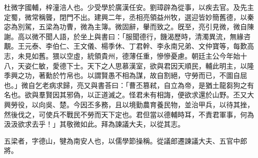 \begin{pinyinscope}
 
 
 杜微字國輔，梓潼涪人也。少受學於廣漢任安。劉璋辟為從事，以疾去官。及先主定蜀，微常稱聾，閉門不出。建興二年，丞相亮領益州牧，選迎皆妙簡舊德，以秦宓為別駕，五梁為功曹，微為主簿。微固辭，轝而致之。旣至，亮引見微，微自陳謝。高以微不聞人語，於坐上與書曰：「服聞德行，饑渴歷時，清濁異流，無緣咨覯。王元泰、李伯仁、王文儀、楊季休、丁君幹、李永南兄弟、文仲寶等，每歎高志，未見如舊。猥以空虛，統領貴州，德薄任重，慘慘憂慮。朝廷主公今年始十八，天姿仁敏，愛德下士。天下之人思慕漢室，欲與君因天順民，輔此明主，以隆季興之功，著勳於竹帛也。以謂賢愚不相為謀，故自割絕，守勞而已，不圖自屈也。」微自乞老病求歸，亮又與書荅曰：「曹丕篡弒，自立為帝，是猶土龍芻狗之有名也。欲與羣賢因其邪偽，以正道滅之。怪君未有相誨，便欲求還於山野。丕又大興勞役，以向吳、楚。今因丕多務，且以境勤農育養民物，並治甲兵，以待其挫，然後伐之，可使兵不戰民不勞而天下定也。君但當以德輔時耳，不責君軍事，何為汲汲欲求去乎！」其敬微如此。拜為諫議大夫，以從其志。
 
 
 
 
 五梁者，字德山，犍為南安人也，以儒學節操稱。從議郎遷諫議大夫、五官中郎將。
 
 
\end{pinyinscope}